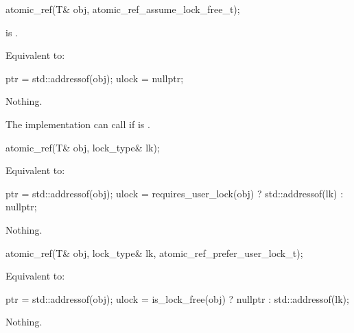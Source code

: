 \begin{addedblock}
\begin{itemdecl}
atomic_ref(T& obj, atomic_ref_assume_lock_free_t);
\end{itemdecl}

\begin{itemdescr}
\pnum
\expects {} is .

\pnum
\effects Equivalent to:
\begin{codeblock}
  ptr = std::addressof(obj);
  ulock = nullptr;
\end{codeblock}

\pnum
\throws Nothing.

\pnum
\remarks The implementation can call  if  is .

\end{itemdescr}
\end{addedblock}


\begin{addedblock}
\begin{itemdecl}
atomic_ref(T& obj, lock_type& lk);
\end{itemdecl}

\begin{itemdescr}

\pnum
\effects Equivalent to:
\begin{codeblock}
  ptr = std::addressof(obj);
  ulock = requires_user_lock(obj) ? std::addressof(lk) : nullptr;
\end{codeblock}

\pnum
\throws Nothing.

\end{itemdescr}
\end{addedblock}


\begin{addedblock}
\begin{itemdecl}
atomic_ref(T& obj, lock_type& lk, atomic_ref_prefer_user_lock_t);
\end{itemdecl}

\begin{itemdescr}

\pnum
\effects Equivalent to:
\begin{codeblock}
  ptr = std::addressof(obj);
  ulock = is_lock_free(obj) ? nullptr : std::addressof(lk);
\end{codeblock}

\pnum
\throws Nothing.
\end{itemdescr}

\end{addedblock}


